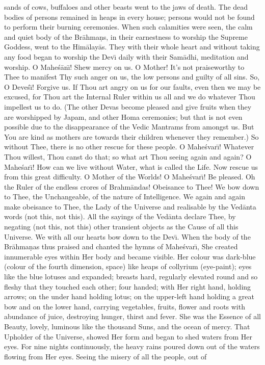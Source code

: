 sands of cows, buffaloes and other beasts went to the jaws of death. The dead bodies of persons remained in heaps in every house; persons would not be found to perform their burning ceremonies. When such calamities were seen, the calm and quiet body of the Br\=ahma\d{n}s, in their earnestness to worship the Supreme Goddess, went to the Him\=alay\=as. They with their whole heart and without taking any food began to worship the Dev\={\i} daily with their Sam\=adhi, meditation and worship. O Mahe\'s\=an\={\i}! Shew mercy on us. O Mother! It's not praiseworthy to Thee to manifest Thy such anger on us, the low persons and guilty of all sins. So, O Deve\'s\={\i}! Forgive us. If Thou art angry on us for our faults, even then we may be excused, for Thou art the Internal Ruler within us all and we do whatever Thou impellest us to do. (The other Devas become pleased and give fruits when they are worshipped by Japam, and other Homa ceremonies; but that is not even possible due to the disappearance of the Vedic Mantrams from amongst us. But You are kind as mothers are towards their children whenever they remember.) So without Thee, there is no other rescue for these people. O Mahe\'svar\={\i}! Whatever Thou willest, Thou canst do that; so what art Thou seeing again and again? O Mahe\'sar\={\i}! How can we live without Water, what is called the Life. Now rescue us from this great difficulty. O Mother of the Worlds! O Mahe\'svar\={\i}! Be pleased. Oh the Ruler of the endless crores of Brahm\=andas! Obeisance to Thee! We bow down to Thee, the Unchangeable, of the nature of Intelligence. We again and again make obeisance to Thee, the Lady of the Universe and realisable by the Ved\=anta words (not this, not this). All the sayings of the Ved\=anta declare Thee, by negating (not this, not this) other transient objects as the Cause of all this Universe. We with all our hearts bow down to the Dev\={\i}. When the body of the Br\=ahma\d{n}as thus praised and chanted the hymns of Mahe\'svar\={\i}, She created innumerable eyes within Her body and became visible. Her colour was dark-blue (colour of the fourth dimension, space) like heaps of collyrium (eye-paint); eyes like the blue lotuses and expanded; breasts hard, regularly elevated round and so fleshy that they touched each other; four handed; with Her right hand, holding arrows; on the under hand holding lotus; on the upper-left hand holding a great bow and on the lower hand, carrying vegetables, fruits, flower and roots with abundance of juice, destroying hunger, thirst and fever. She was the Essence of all Beauty, lovely, luminous like the thousand Suns, and the ocean of mercy. That Upholder of the Universe, showed Her form and began to shed waters from Her eyes. For nine nights continuously, the heavy rains poured down out of the waters flowing from Her eyes. Seeing the misery of all the people, out of

